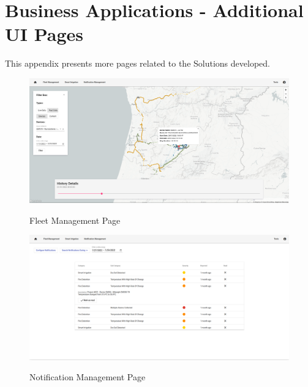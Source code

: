 \chapter{Business Applications - Additional UI Pages}
\label{AppendixD2}

This appendix presents more pages related to the Solutions developed.

\begin{figure}[H]
   \centering
   \resizebox{\columnwidth}{!}
   {
      \includegraphics{assets/figures/ui/fleet.png}
   }
   \caption[Fleet Management Page]{Fleet Management Page}
   \label{fig:AppendixD2:fleet}
\end{figure}

\begin{figure}[H]
   \centering
   \resizebox{\columnwidth}{!}
   {
      \includegraphics{assets/figures/ui/notification.png}
   }
   \caption[Notification Management Page]{Notification Management Page}
   \label{fig:AppendixD2:notification}
\end{figure}

